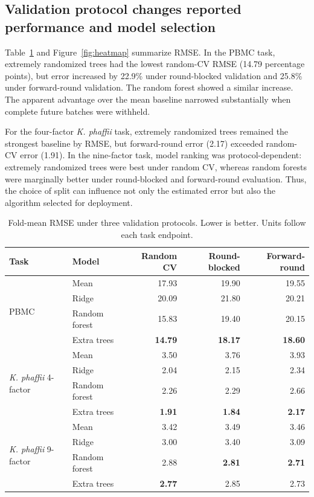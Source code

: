 \documentclass[11pt]{article}
\newcommand{\kp}{\textit{K. phaffii}}
\begin{document}
\subsection{Validation protocol changes reported performance and model selection}
Table~\ref{tab:rmse} and Figure~\ref{fig:heatmap} summarize RMSE. In the PBMC task, extremely randomized trees had the lowest random-CV RMSE (14.79 percentage points), but error increased by 22.9\% under round-blocked validation and 25.8\% under forward-round validation. The random forest showed a similar increase. The apparent advantage over the mean baseline narrowed substantially when complete future batches were withheld.

For the four-factor \kp{} task, extremely randomized trees remained the strongest baseline by RMSE, but forward-round error (2.17) exceeded random-CV error (1.91). In the nine-factor task, model ranking was protocol-dependent: extremely randomized trees were best under random CV, whereas random forests were marginally better under round-blocked and forward-round evaluation. Thus, the choice of split can influence not only the estimated error but also the algorithm selected for deployment.

\begin{table}[ht]
\centering
\caption{Fold-mean RMSE under three validation protocols. Lower is better. Units follow each task endpoint.}
\label{tab:rmse}
\small
\begin{tabular}{llrrr}
\toprule
Task & Model & Random CV & Round-blocked & Forward-round \\
\midrule
\multirow{4}{*}{PBMC}
 & Mean & 17.93 & 19.90 & 19.55 \\
 & Ridge & 20.09 & 21.80 & 20.21 \\
 & Random forest & 15.83 & 19.40 & 20.15 \\
 & Extra trees & \textbf{14.79} & \textbf{18.17} & \textbf{18.60} \\
\midrule
\multirow{4}{*}{\kp{} 4-factor}
 & Mean & 3.50 & 3.76 & 3.93 \\
 & Ridge & 2.04 & 2.15 & 2.34 \\
 & Random forest & 2.26 & 2.29 & 2.66 \\
 & Extra trees & \textbf{1.91} & \textbf{1.84} & \textbf{2.17} \\
\midrule
\multirow{4}{*}{\kp{} 9-factor}
 & Mean & 3.42 & 3.49 & 3.46 \\
 & Ridge & 3.00 & 3.40 & 3.09 \\
 & Random forest & 2.88 & \textbf{2.81} & \textbf{2.71} \\
 & Extra trees & \textbf{2.77} & 2.85 & 2.73 \\
\bottomrule
\end{tabular}
\end{table}
\end{document}
